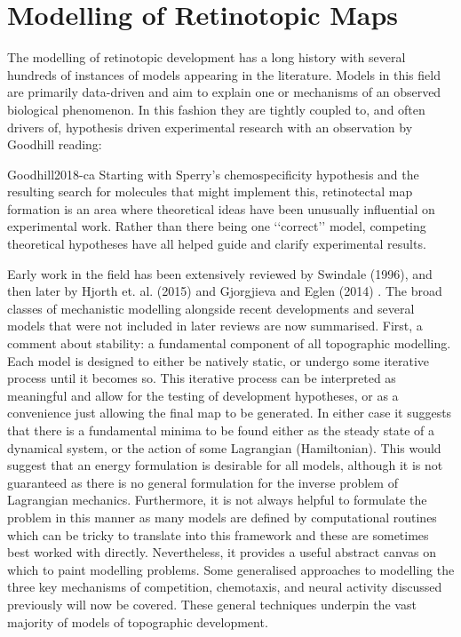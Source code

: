\section{Modelling of Retinotopic Maps \label{sec:models}}
The modelling of retinotopic development has a long history with several hundreds of instances of models appearing in the literature. Models in this field are primarily data-driven and aim to explain one or mechanisms of an observed biological phenomenon. In this fashion they are tightly coupled to, and often drivers of, hypothesis driven experimental research with an observation by Goodhill reading: 
\begin{displaycquote}{Goodhill2018-ca}
Starting with Sperry’s chemospecificity hypothesis and the resulting search for molecules that might implement this, retinotectal map formation is an area where theoretical ideas have been unusually influential on experimental work. Rather than there being one ‘‘correct’’ model, competing theoretical hypotheses have all helped guide and clarify experimental results.
\end{displaycquote}
Early work in the field has been extensively reviewed by Swindale (1996), and then later by Hjorth et. al. (2015) and Gjorgjieva and Eglen (2014) \cite{Swindale1996-kk, Hjorth2015-le, Gjorgjieva2011-de}. The broad classes of mechanistic modelling alongside recent developments and several models that were not included in later reviews are now summarised. First, a comment about stability: a fundamental component of all topographic modelling. Each model is designed to either be natively static, or undergo some iterative process until it becomes so. This iterative process can be interpreted as meaningful and allow for the testing of development hypotheses, or as a convenience just allowing the final map to be generated. In either case it suggests that there is a fundamental minima to be found either as the steady state of a dynamical system, or the action of some Lagrangian (Hamiltonian). This would suggest that an energy formulation is desirable for all models, although it is not guaranteed as there is no general formulation for the inverse problem of Lagrangian mechanics. Furthermore, it is not always helpful to formulate the problem in this manner as many models are defined by computational routines which can be tricky to translate into this framework and these are sometimes best worked with directly. Nevertheless, it provides a useful abstract canvas on which to paint modelling problems. 
Some generalised approaches to modelling the three key mechanisms of competition, chemotaxis, and neural activity discussed previously will now be covered. These general techniques underpin the vast majority of models of topographic development.
